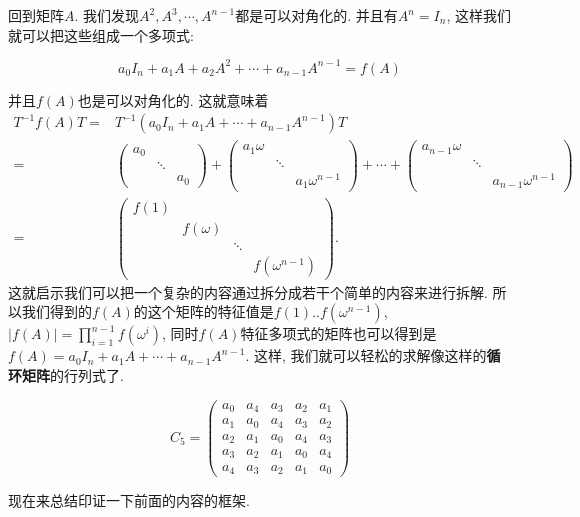 回到矩阵$A$. 我们发现$A^{2},A^{3},\cdots,A^{n-1}$都是可以对角化的. 并且有$A^{n}=I_{n}$,
这样我们就可以把这些组成一个多项式: 

\[
a_{0}I_{n}+a_{1}A+a_{2}A^{2}+\cdots+a_{n-1}A^{n-1}=f(A)
\]

并且$f(A)$也是可以对角化的. 这就意味着
\begin{align*}
T^{-1}f(A)T= & T^{-1}(a_{0}I_{n}+a_{1}A+\cdots+a_{n-1}A^{n-1})T\\
= & \begin{pmatrix}a_{0}\\
 & \ddots\\
 &  & a_{0}
\end{pmatrix}+\begin{pmatrix}a_{1}\omega\\
 & \ddots\\
 &  & a_{1}\omega^{n-1}
\end{pmatrix}+\cdots+\begin{pmatrix}a_{n-1}\omega\\
 & \ddots\\
 &  & a_{n-1}\omega^{n-1}
\end{pmatrix}\\
= & \begin{pmatrix}f(1)\\
 & f(\omega)\\
 &  & \ddots\\
 &  &  & f(\omega^{n-1})
\end{pmatrix}.
\end{align*}
这就启示我们可以把一个复杂的内容通过拆分成若干个简单的内容来进行拆解. 所以我们得到的$f(A)$的这个矩阵的特征值是$f(1)..f(\omega^{n-1})$,
$|f(A)|=\prod_{i=1}^{n-1}f(\omega^{i})$, 同时$f(A)$特征多项式的矩阵也可以得到是$f(A)=a_{0}I_{n}+a_{1}A+\cdots+a_{n-1}A^{n-1}$.
这样, 我们就可以轻松的求解像这样的\textbf{循环矩阵}的行列式了.

\[
C_{5}=\begin{pmatrix}a_{0} & a_{4} & a_{3} & a_{2} & a_{1}\\
a_{1} & a_{0} & a_{4} & a_{3} & a_{2}\\
a_{2} & a_{1} & a_{0} & a_{4} & a_{3}\\
a_{3} & a_{2} & a_{1} & a_{0} & a_{4}\\
a_{4} & a_{3} & a_{2} & a_{1} & a_{0}
\end{pmatrix}
\]

现在来总结印证一下前面的内容的框架.


